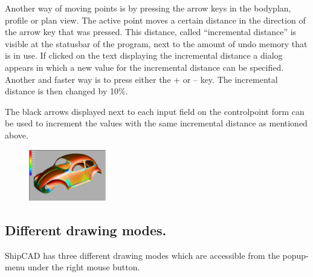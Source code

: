 \documentclass[12pt]{article}
\begin{document}
Another way of moving points is by
pressing the arrow keys in the bodyplan, profile or plan view.  The
active point moves a certain distance in the direction of the arrow
key that was pressed. This distance, called “incremental distance” is
visible at the statusbar of the program, next to the amount of undo
memory that is in use. If clicked on the text displaying the
incremental distance a dialog appears in which a new value for the
incremental distance can be specified. Another and faster way is to
press either the + or – key. The incremental distance is then changed
by 10\%.

The black arrows displayed next to each input field on the
controlpoint form can be used to increment the values with the same
incremental distance as mentioned above.

\begin{figure}
        \centering
        \includegraphics[width=0.3\textwidth,natwidth=604,natheight=400]{surfacecurvaturevw.png}
        \caption{}
        \label{fig:surfcurvvw}
\end{figure}

\subsection{Different drawing modes.}
ShipCAD has three different drawing modes which are accessible from the popup-menu under the
right mouse button.
\end{document}
